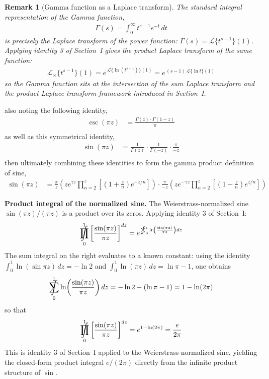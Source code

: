\documentclass{article}
\newtheorem*{remark}{Remark}
\DeclareMathOperator*{\SumInt}{%
\mathchoice%
  {\ooalign{$\displaystyle\sum$\cr\hidewidth$\displaystyle\int$\hidewidth\cr}}
  {\ooalign{\raisebox{.14\height}{\scalebox{.7}{$\textstyle\sum$}}\cr\hidewidth$\textstyle\int$\hidewidth\cr}}
  {\ooalign{\raisebox{.2\height}{\scalebox{.6}{$\scriptstyle\sum$}}\cr$\scriptstyle\int$\cr}}
  {\ooalign{\raisebox{.2\height}{\scalebox{.6}{$\scriptstyle\sum$}}\cr$\scriptstyle\int$\cr}}
}
\DeclareMathOperator*{\ProdInt}{%
\mathchoice%
  {\ooalign{$\displaystyle\prod$\cr\hidewidth$\displaystyle\int$\hidewidth\cr}}
  {\ooalign{\raisebox{.14\height}{\scalebox{.7}{$\textstyle\prod$}}\cr\hidewidth$\textstyle\int$\hidewidth\cr}}
  {\ooalign{\raisebox{.2\height}{\scalebox{.6}{$\scriptstyle\prod$}}\cr$\scriptstyle\int$\cr}}
  {\ooalign{\raisebox{.2\height}{\scalebox{.6}{$\scriptstyle\prod$}}\cr$\scriptstyle\int$\cr}}
}
\begin{document}
\begin{remark}[Gamma function as a Laplace transform]
The standard integral representation of the Gamma function,
\begin{align*}
\Gamma(s) = \int_0^{\infty} t^{s-1} e^{-t}\,dt
\end{align*}
is precisely the Laplace transform of the power function: $\Gamma(s) = \mathcal{L}\{t^{s-1}\}(1)$. Applying identity 3 of Section~I gives the product Laplace transform of the same function:
\begin{align*}
\mathcal{L}_\times\{t^{s-1}\}(1) = e^{\,\mathcal{L}\{\ln(t^{s-1})\}(1)} = e^{\,(s-1)\,\mathcal{L}\{\ln t\}(1)}
\end{align*}
so the Gamma function sits at the intersection of the sum Laplace transform and the product Laplace transform framework introduced in Section~I.
\end{remark}
also noting the following identity,
\begin{align*}
\csc(\pi z) &= \frac{\Gamma\left(z\right) \cdot \Gamma\left(1 - z\right)}{\pi} \\
\end{align*}
as well as this symmetrical identity,
\begin{align*}
\sin(\pi z) &= \frac{1}{\Gamma\left(z\right)} \cdot \frac{1}{\Gamma\left(-z\right)} \cdot \frac{\pi}{-z} \\
\end{align*}
then ultimately combining these identities to form the gamma product definition of sine,
\begin{align*}
\sin(\pi z) &= \frac{\pi}{z} \left(ze^{\gamma z} \prod_{n=2}^z \left[\left(1 + \frac{z}{n}\right)e^{-z/n}\right]\right) \cdot \frac{\pi}{-z} \left(ze^{-\gamma z} \prod_{n=2}^z \left[\left(1 - \frac{z}{n}\right)e^{z/n}\right]\right)
\end{align*}

\textbf{Product integral of the normalized sine.} The Weierstrass-normalized sine $\sin(\pi z)/(\pi z)$ is a product over its zeros. Applying identity 3 of Section~I:
\begin{align*}
\ProdInt_0^1 \left[\frac{\sin(\pi z)}{\pi z}\right]^{dz}
  = e^{\,\SumInt_0^1 \ln\!\left(\frac{\sin(\pi z)}{\pi z}\right)dz}
\end{align*}
The sum integral on the right evaluates to a known constant: using the identity $\int_0^1 \ln(\sin \pi z)\,dz = -\ln 2$ and $\int_0^1 \ln(\pi z)\,dz = \ln\pi - 1$, one obtains
\begin{align*}
\SumInt_0^1 \ln\!\left(\frac{\sin(\pi z)}{\pi z}\right)dz = -\ln 2 - (\ln\pi - 1) = 1 - \ln(2\pi)
\end{align*}
so that
\begin{align*}
\ProdInt_0^1 \left[\frac{\sin(\pi z)}{\pi z}\right]^{dz} = e^{1 - \ln(2\pi)} = \frac{e}{2\pi}
\end{align*}
This is identity 3 of Section~I applied to the Weierstrass-normalized sine, yielding the closed-form product integral $e/(2\pi)$ directly from the infinite product structure of $\sin$.
\end{document}
